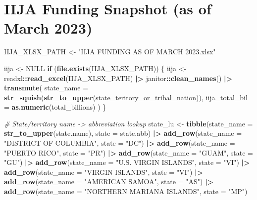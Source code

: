 \documentclass[
  11pt,
]{article}
\newenvironment{Shaded}{\begin{snugshade}}{\end{snugshade}}
\newcommand{\AttributeTok}[1]{\textcolor[rgb]{0.13,0.29,0.53}{#1}}
\newcommand{\CommentTok}[1]{\textcolor[rgb]{0.56,0.35,0.01}{\textit{#1}}}
\newcommand{\ConstantTok}[1]{\textcolor[rgb]{0.56,0.35,0.01}{#1}}
\newcommand{\ControlFlowTok}[1]{\textcolor[rgb]{0.13,0.29,0.53}{\textbf{#1}}}
\newcommand{\FunctionTok}[1]{\textcolor[rgb]{0.13,0.29,0.53}{\textbf{#1}}}
\newcommand{\NormalTok}[1]{#1}
\newcommand{\OtherTok}[1]{\textcolor[rgb]{0.56,0.35,0.01}{#1}}
\newcommand{\SpecialCharTok}[1]{\textcolor[rgb]{0.81,0.36,0.00}{\textbf{#1}}}
\newcommand{\StringTok}[1]{\textcolor[rgb]{0.31,0.60,0.02}{#1}}
\begin{document}
\section{IIJA Funding Snapshot (as of March
2023)}\label{iija-funding-snapshot-as-of-march-2023}

\begin{Shaded}
\begin{Highlighting}[]
\NormalTok{IIJA\_XLSX\_PATH }\OtherTok{\textless{}{-}} \StringTok{"IIJA FUNDING AS OF MARCH 2023.xlsx"}

\NormalTok{iija }\OtherTok{\textless{}{-}} \ConstantTok{NULL}
\ControlFlowTok{if}\NormalTok{ (}\FunctionTok{file.exists}\NormalTok{(IIJA\_XLSX\_PATH)) \{}
\NormalTok{  iija }\OtherTok{\textless{}{-}}\NormalTok{ readxl}\SpecialCharTok{::}\FunctionTok{read\_excel}\NormalTok{(IIJA\_XLSX\_PATH) }\SpecialCharTok{|\textgreater{}}
\NormalTok{    janitor}\SpecialCharTok{::}\FunctionTok{clean\_names}\NormalTok{() }\SpecialCharTok{|\textgreater{}}
    \FunctionTok{transmute}\NormalTok{(}
      \AttributeTok{state\_name =} \FunctionTok{str\_squish}\NormalTok{(}\FunctionTok{str\_to\_upper}\NormalTok{(state\_teritory\_or\_tribal\_nation)),}
      \AttributeTok{iija\_total\_bil =} \FunctionTok{as.numeric}\NormalTok{(total\_billions)}
\NormalTok{    )}
\NormalTok{\}}

\CommentTok{\# State/territory name {-}\textgreater{} abbreviation lookup}
\NormalTok{state\_lu }\OtherTok{\textless{}{-}} \FunctionTok{tibble}\NormalTok{(}\AttributeTok{state\_name =} \FunctionTok{str\_to\_upper}\NormalTok{(state.name), }\AttributeTok{state =}\NormalTok{ state.abb) }\SpecialCharTok{|\textgreater{}}
  \FunctionTok{add\_row}\NormalTok{(}\AttributeTok{state\_name =} \StringTok{"DISTRICT OF COLUMBIA"}\NormalTok{, }\AttributeTok{state =} \StringTok{"DC"}\NormalTok{) }\SpecialCharTok{|\textgreater{}}
  \FunctionTok{add\_row}\NormalTok{(}\AttributeTok{state\_name =} \StringTok{"PUERTO RICO"}\NormalTok{, }\AttributeTok{state =} \StringTok{"PR"}\NormalTok{) }\SpecialCharTok{|\textgreater{}}
  \FunctionTok{add\_row}\NormalTok{(}\AttributeTok{state\_name =} \StringTok{"GUAM"}\NormalTok{, }\AttributeTok{state =} \StringTok{"GU"}\NormalTok{) }\SpecialCharTok{|\textgreater{}}
  \FunctionTok{add\_row}\NormalTok{(}\AttributeTok{state\_name =} \StringTok{"U.S. VIRGIN ISLANDS"}\NormalTok{, }\AttributeTok{state =} \StringTok{"VI"}\NormalTok{) }\SpecialCharTok{|\textgreater{}}
  \FunctionTok{add\_row}\NormalTok{(}\AttributeTok{state\_name =} \StringTok{"VIRGIN ISLANDS"}\NormalTok{, }\AttributeTok{state =} \StringTok{"VI"}\NormalTok{) }\SpecialCharTok{|\textgreater{}}
  \FunctionTok{add\_row}\NormalTok{(}\AttributeTok{state\_name =} \StringTok{"AMERICAN SAMOA"}\NormalTok{, }\AttributeTok{state =} \StringTok{"AS"}\NormalTok{) }\SpecialCharTok{|\textgreater{}}
  \FunctionTok{add\_row}\NormalTok{(}\AttributeTok{state\_name =} \StringTok{"NORTHERN MARIANA ISLANDS"}\NormalTok{, }\AttributeTok{state =} \StringTok{"MP"}\NormalTok{)}


\end{Highlighting}
\end{Shaded}
\end{document}

